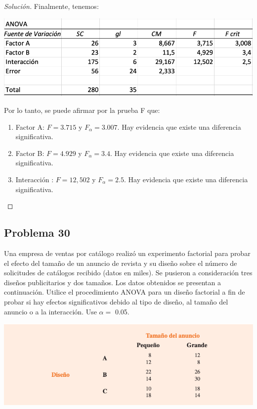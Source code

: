 \documentclass[a4paper,12pt]{article}
\newenvironment{solution}
  {\renewcommand\qedsymbol{$\blacksquare$}\begin{proof}[Solución]}
  {\end{proof}}
\begin{document}
\begin{solution}
Finalmente, tenemos: 
\begin{center}
    \includegraphics[scale=0.3]{Images/anova.png}
\end{center}
Por lo tanto, se puede afirmar por la prueba F que: 
\begin{enumerate}
    \item Factor A: $F=3.715$ y $F_\alpha=3.007$. Hay evidencia que existe una diferencia significativa.
    \item Factor B: $F=4.929$ y $F_\alpha=3.4$. Hay evidencia que existe una diferencia significativa.
    \item Interacción : $F=12,502$ y $F_\alpha=2.5$. Hay evidencia que existe una diferencia significativa.
\end{enumerate}
\end{solution}
\subsection{Problema 30}
Una empresa de ventas por catálogo realizó un experimento factorial para probar el efecto del tamaño de un anuncio de revista y su diseño sobre el número de solicitudes de catálogos recibido (datos en miles). Se pusieron a consideración tres diseños publicitarios y dos tamaños. Los datos obtenidos se presentan a continuación. Utilice el procedimiento ANOVA para un diseño factorial a fin de probar si hay efectos significativos debido al tipo de diseño, al tamaño del anuncio o a la interacción. Use $\alpha=$ 0.05.
\begin{center}
    \includegraphics[scale=0.5]{Images/30.png}
\end{center}
\end{document}
